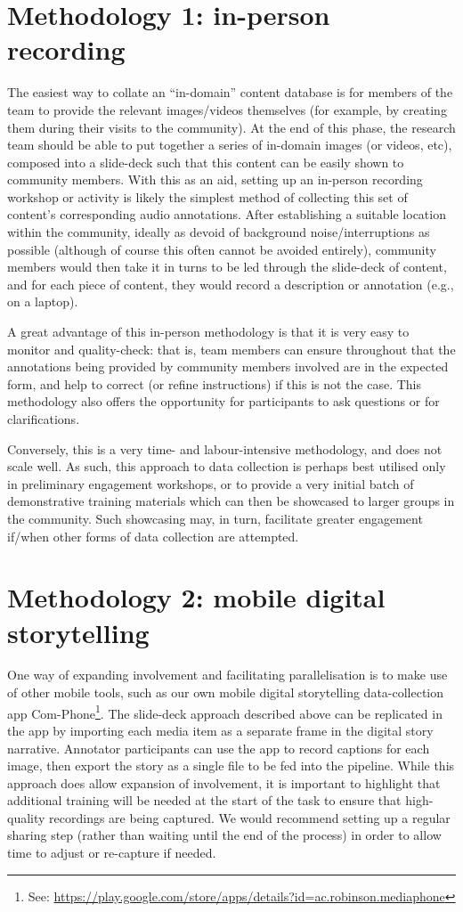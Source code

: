 \documentclass[10pt,twoside,openright]{report}
\begin{document}
\section{Methodology 1: in-person recording}
The easiest way to collate an ``in-domain'' content database is for members of the team to provide the relevant images/videos themselves (for example, by creating them during their visits to the community).
At the end of this phase, the research team should be able to put together a series of in-domain images (or videos, etc), composed into a slide-deck such that this content can be easily shown to community members. 
With this as an aid,
setting up an in-person recording workshop or activity is likely the simplest method of collecting this set of content's corresponding audio annotations.
After establishing a suitable location within the community, ideally as devoid of background noise/interruptions as possible (although of course this often cannot be avoided entirely), community members would then take it in turns to be led through the slide-deck of content, and for each piece of content, they would record a description or annotation (e.g., on a laptop).

A great advantage of this in-person methodology is that it is very easy to monitor and quality-check: that is, team members can ensure throughout that the annotations being provided by community members involved are in the expected form, and help to correct (or refine instructions) if this is not the case.
This methodology also offers the opportunity for participants to ask questions or for clarifications. 

Conversely, this is a very time- and labour-intensive methodology, and does not scale well.
As such, this approach to data collection is perhaps best utilised only in preliminary engagement workshops, or to provide a very initial batch of demonstrative training materials which can then be showcased to larger groups in the community.
Such showcasing may, in turn, facilitate greater engagement if/when other forms of data collection are attempted.


\section{Methodology 2: mobile digital storytelling}
One way of expanding involvement and facilitating parallelisation
is to make use of other mobile tools, such as our own mobile digital storytelling data-collection app Com-Phone\footnote{See: \url{https://play.google.com/store/apps/details?id=ac.robinson.mediaphone}}.
The slide-deck approach described above can be replicated in the app by importing each media item as a separate frame in the digital story narrative.
Annotator participants can use the app to record captions for each image, then export the story as a single file to be fed into the pipeline.
While this approach does allow expansion of involvement, it is important to highlight that additional training will be needed at the start of the task to ensure that high-quality recordings are being captured.
We would recommend setting up a regular sharing step (rather than waiting until the end of the process) in order to allow time to adjust or re-capture if needed.
\end{document}
